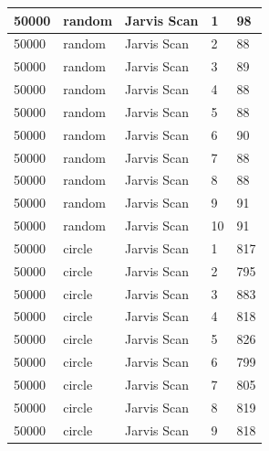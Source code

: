 \documentclass[12pt]{article}
\begin{document}
\begin{longtable}{|l|l|l|l|l|}
50000        & random            & Jarvis Scan & 1          & 98                            \\ \hline
50000        & random            & Jarvis Scan & 2          & 88                            \\ \hline
50000        & random            & Jarvis Scan & 3          & 89                            \\ \hline
50000        & random            & Jarvis Scan & 4          & 88                            \\ \hline
50000        & random            & Jarvis Scan & 5          & 88                            \\ \hline
50000        & random            & Jarvis Scan & 6          & 90                            \\ \hline
50000        & random            & Jarvis Scan & 7          & 88                            \\ \hline
50000        & random            & Jarvis Scan & 8          & 88                            \\ \hline
50000        & random            & Jarvis Scan & 9          & 91                            \\ \hline
50000        & random            & Jarvis Scan & 10         & 91                            \\ \hline
50000        & circle            & Jarvis Scan & 1          & 817                           \\ \hline
50000        & circle            & Jarvis Scan & 2          & 795                           \\ \hline
50000        & circle            & Jarvis Scan & 3          & 883                           \\ \hline
50000        & circle            & Jarvis Scan & 4          & 818                           \\ \hline
50000        & circle            & Jarvis Scan & 5          & 826                           \\ \hline
50000        & circle            & Jarvis Scan & 6          & 799                           \\ \hline
50000        & circle            & Jarvis Scan & 7          & 805                           \\ \hline
50000        & circle            & Jarvis Scan & 8          & 819                           \\ \hline
50000        & circle            & Jarvis Scan & 9          & 818                           \\ \hline

\end{longtable}
\end{document}
